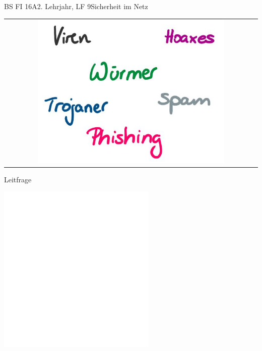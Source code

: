 \documentclass[oneside,openany,headings=optiontotoc,11pt,numbers=noenddot]{scrreprt}
\begin{document}
	\begin{worksheet}{BS FI 16A}{2. Lehrjahr, LF 9}{Sicherheit im Netz}
		
		\noindent
		\begin{framed}
			\begin{tabular}{lcr}
				& \includegraphics[width=0.8\textwidth]{Gefahren.jpg} &
			\end{tabular}
		\end{framed}

		\setlength{\fboxsep}{1mm}
		\begin{framed}
			\tiny{\color{codegray}Leitfrage}
			\par
			\bigskip
		\end{framed}
	
		\begin{framed}
			\includegraphics[width=0.57\textwidth]{../empty.jpg}
		\end{framed}
		
	\end{worksheet}
\end{document}
